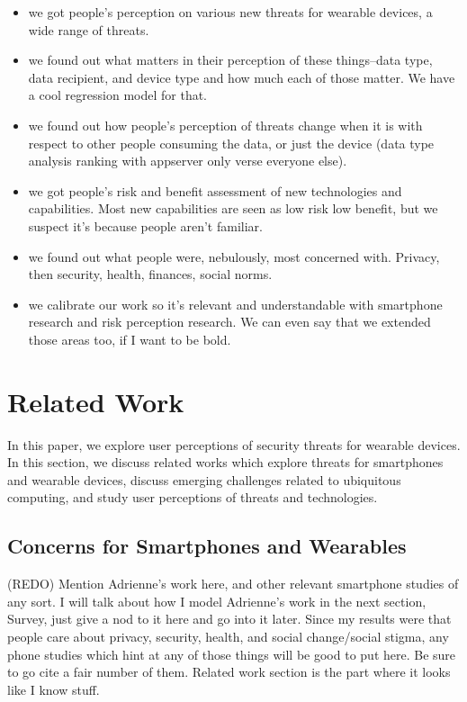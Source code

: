 \documentclass{acm_proc_article-sp}
\begin{document}
\begin{itemize} \itemsep1pt \parskip0pt 
\item we got people's perception on various new threats for wearable devices, a wide range of threats.
\item we found out what matters in their perception of these things--data type, data recipient, and device type and how much each of those matter. We have a cool regression model for that. 
\item we found out how people's perception of threats change when it is with respect to other people consuming the data, or just the device (data type analysis ranking with appserver only verse everyone else). 
\item we got people's risk and benefit assessment of new technologies and capabilities. Most new capabilities are seen as low risk low benefit, but we suspect it's because people aren't familiar. 
\item we found out what people were, nebulously, most concerned with. Privacy, then security, health, finances, social norms. 
\item we calibrate our work so it's relevant and understandable with smartphone research and risk perception research. We can even say that we extended those areas too, if I want to be bold. 
\end{itemize}


\section{Related Work}
In this paper, we explore user perceptions of security threats for wearable devices. In this section, we discuss related works which explore threats for smartphones and wearable devices, discuss emerging challenges related to ubiquitous computing, and study user perceptions of threats and technologies. 

\subsection{Concerns for Smartphones and Wearables}
(REDO) Mention Adrienne's work here, and other relevant smartphone studies of any sort. I will talk about how I model Adrienne's work in the next section, Survey, just give a nod to it here and go into it later. Since my results were that people care about privacy, security, health, and social change/social stigma, any phone studies which hint at any of those things will be good to put here. Be sure to go cite a fair number of them. Related work section is the part where it looks like I know stuff. 
\end{document}
